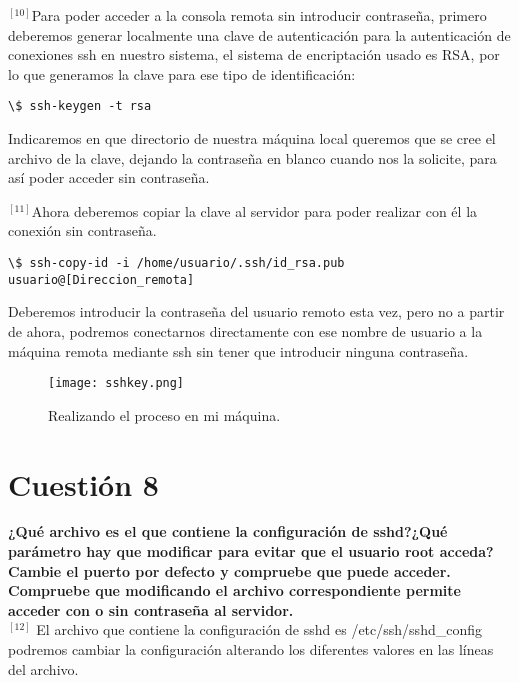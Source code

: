 \documentclass[a4paper, 11pt]{article} %
\begin{document}
$^{[10]}$Para poder acceder a la consola remota sin introducir contraseña, primero deberemos generar localmente una clave de autenticación para la autenticación de conexiones ssh en nuestro sistema, el sistema de encriptación usado es RSA, por lo que generamos la clave para ese tipo de identificación:

\begin{verbatim}
\$ ssh-keygen -t rsa
\end{verbatim}

Indicaremos en que directorio de nuestra máquina local queremos que se cree el archivo de la clave, dejando la contraseña en blanco cuando nos la solicite, para así poder acceder sin contraseña.

$^{[11]}$Ahora deberemos copiar la clave al servidor para poder realizar con él la conexión sin contraseña.

\begin{verbatim}
\$ ssh-copy-id -i /home/usuario/.ssh/id_rsa.pub usuario@[Direccion_remota]
\end{verbatim}

Deberemos introducir la contraseña del usuario remoto esta vez, pero no a partir de ahora, podremos conectarnos directamente con ese nombre de usuario a la máquina remota mediante ssh sin tener que introducir ninguna contraseña.

\pagebreak

\begin{figure}[h]
\centering 
\texttt{[image: sshkey.png]} 
\caption{Realizando el proceso en mi máquina.} 
\vspace{-0.5cm}
\label{contexto:figura} 
\end{figure}

\pagebreak

\section{Cuestión 8}
\textbf{¿Qué archivo es el que contiene la configuración de sshd?¿Qué parámetro hay que modificar para evitar que el usuario root acceda? Cambie el puerto por defecto y compruebe que puede acceder. Compruebe que modificando el archivo correspondiente permite acceder con o sin contraseña al servidor.}\\

$^{[12]}$ El archivo que contiene la configuración de sshd es /etc/ssh/sshd\_config podremos cambiar la configuración alterando los diferentes valores en las líneas del archivo.\\
\end{document}
